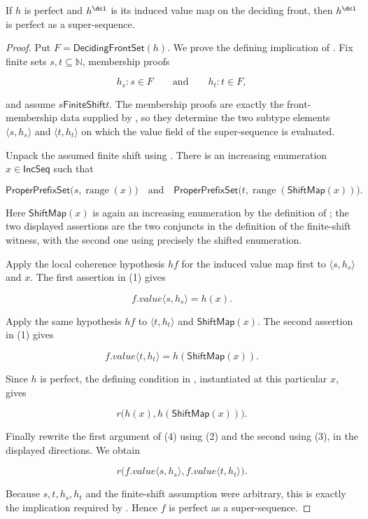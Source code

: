 \begin{lemma}
If $h$ is perfect and $h^{\dcl}$ is its induced value map on the deciding
front, then $h^{\dcl}$ is perfect as a super-sequence.
\end{lemma}
\begin{proof}
Put $F=\mathsf{DecidingFrontSet}(h)$.  We prove the defining implication
of .  Fix finite sets $s,t\subseteq\mathbb N$,
membership proofs

\[
 h_s:s\in F\qquad\text{and}\qquad h_t:t\in F,
\]

and assume $s\mathrel{\mathsf{FiniteShift}}t$.  The membership proofs are
exactly the front-membership data supplied by ,
so they determine the two subtype elements
$\langle s,h_s\rangle$ and $\langle t,h_t\rangle$ on which the value
field of the super-sequence  is evaluated.

Unpack the assumed finite shift using .  There is an
increasing enumeration $x\in\mathsf{IncSeq}$ such that

\[
 \mathsf{ProperPrefixSet}\bigl(s,\operatorname{range}(x)\bigr)
 \quad\text{and}\quad
 \mathsf{ProperPrefixSet}\bigl(t,
       \operatorname{range}(\mathsf{ShiftMap}(x))\bigr).
 \tag{1}
\]

Here $\mathsf{ShiftMap}(x)$ is again an increasing enumeration by the
definition of ; the two displayed assertions are the two
conjuncts in the definition of the finite-shift witness, with the second
one using precisely the shifted enumeration.

Apply the local coherence hypothesis $hf$ for the induced value map first to
$\langle s,h_s\rangle$ and $x$.  The first assertion in (1) gives

\[
 f.value\langle s,h_s\rangle=h(x).
 \tag{2}
\]

Apply the same hypothesis $hf$ to $\langle t,h_t\rangle$ and
$\mathsf{ShiftMap}(x)$.  The second assertion in (1) gives

\[
 f.value\langle t,h_t\rangle=h(\mathsf{ShiftMap}(x)).
 \tag{3}
\]

Since $h$ is perfect, the defining condition in
, instantiated at this particular $x$,
gives

\[
 r\bigl(h(x),h(\mathsf{ShiftMap}(x))\bigr).
 \tag{4}
\]

Finally rewrite the first argument of (4) using (2) and the second using
(3), in the displayed directions.  We obtain

\[
 r\bigl(f.value\langle s,h_s\rangle,
        f.value\langle t,h_t\rangle\bigr).
\]

Because $s,t,h_s,h_t$ and the finite-shift assumption were arbitrary, this
is exactly the implication required by
.  Hence $f$ is perfect as a
super-sequence.
\end{proof}
